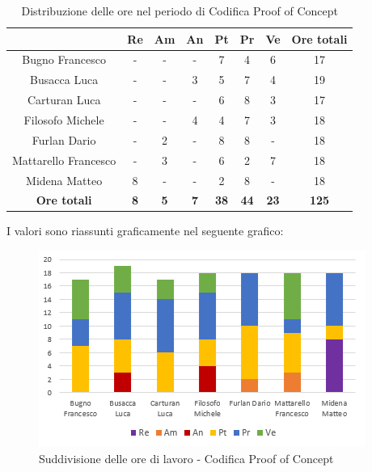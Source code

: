    \begin{table}[H]
       \centering
       \renewcommand{\arraystretch}{1.8}
       \begin{tabular}{c|c|c|c|c|c|c|c}
         \rowcolor[HTML]{125E28} 
         \multicolumn{1}{c}{\color[HTML]{FFFFFF}\textbf{ Nominativo }}
         & \multicolumn{1}{c}{\color[HTML]{FFFFFF}\textbf{ Re }}
         & \multicolumn{1}{c}{\color[HTML]{FFFFFF}\textbf{ Am}}
         & \multicolumn{1}{c}{\color[HTML]{FFFFFF}\textbf{ An }}
         & \multicolumn{1}{c}{\color[HTML]{FFFFFF}\textbf{ Pt }}
         & \multicolumn{1}{c}{\color[HTML]{FFFFFF}\textbf{ Pr }}
         & \multicolumn{1}{c}{\color[HTML]{FFFFFF}\textbf{ Ve }}
         & \multicolumn{1}{c}{\color[HTML]{FFFFFF}\textbf{ Ore totali }}\\
         \hline
         Bugno Francesco        & - & - & - & 7 & 4 & 6 & 17\\
         Busacca Luca           & - & - & 3 & 5 & 7 & 4 & 19\\
         Carturan Luca          & - & - & - & 6 & 8 & 3 & 17\\
         Filosofo Michele       & - & - & 4 & 4 & 7 & 3 & 18\\
         Furlan Dario           & - & 2 & - & 8 & 8 & - & 18\\
         Mattarello Francesco   & - & 3 & - & 6 & 2 & 7 & 18\\
         Midena Matteo          & 8 & - & - & 2 & 8 & - & 18\\
         \textbf{Ore totali} & \textbf{8} & \textbf{5} & \textbf{7} & \textbf{38} & \textbf{44} & \textbf{23} & \textbf{125}
       \end{tabular}
       \caption{Distribuzione delle ore nel periodo di Codifica Proof of Concept\glo}
     \end{table}
   
   I valori sono riassunti graficamente nel seguente grafico:
   
   \begin{figure}[H]
       \centering
        \includegraphics[scale=1.2]{immagini/ore_lavoro_PoC.png}
        \caption{Suddivisione delle ore di lavoro - Codifica Proof of Concept\glo}
      \end{figure}
   
